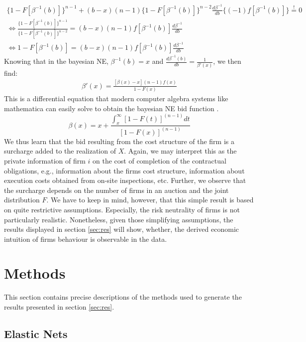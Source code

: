 \documentclass[a4paper,12pt, headsepline]{scrartcl}
\numberwithin{equation}{section}
\begin{document}
\begin{gather*}
\{1-F[\beta^{-1}(b)]\}^{n-1} + (b - x)(n - 		1)\{1-F[\beta^{-1}(b)]\}^{n-2}\frac{d\beta^{-1}}{db}\{(-1)f[\beta^{-1}(b)]\} \overset{!}{=} 0\\
	\iff \frac{\{1-F[\beta^{-1}(b)]\}^{n-1}}{\{1-F[\beta^{-1}(b)]\}^{n-2}} = (b - x)(n - 1)f[\beta^{-1}(b)]\frac{d\beta^{-1}}{db}\\
	\iff 1-F[\beta^{-1}(b)] = (b - x)(n - 1)f[\beta^{-1}(b)]\frac{d\beta^{-1}}{db}
\end{gather*}
Knowing that in the bayesian NE, $\beta^{-1}(b) = x$ and $\frac{d\beta^{-1}(b)}{db} = \frac{1}{\beta'(x)}$, we then find:
\begin{gather*}
	\beta'(x) = \frac{[\beta(x) - x](n - 1)f(x)}{1-F(x)}
\end{gather*}
This is a differential equation that modern computer algebra systems like mathematica can easily solve to obtain the bayesian NE bid function \citep{mathematica}.
\[
\beta(x) = x + \frac{\int_x^\infty [1 - F(t)]^{(n-1)}dt}{[1-F(x)]^{(n-1)}}
\]
We thus learn that the bid resulting from the cost structure of the firm is a surcharge added to the realization of $X$. Again, we may interpret this as the private information of firm $i$ on the cost of completion of the contractual obligations, e.g., information about the firms cost structure, information about execution costs obtained from on-site inspections, etc. Further, we observe that the surcharge depends on the number of firms in an auction and the joint distribution $F$. We have to keep in mind, however, that this simple result is based on quite restrictive assumptions. Especially, the risk neutrality of firms is not particularly realistic. Nonetheless, given those simplifying assumptions, the results displayed in section \ref{sec:res} will show, whether, the derived economic intuition of firms behaviour is observable in the data.
\newpage
\section{Methods}\label{sec:meth}

This section contains precise descriptions of the methods used to generate the results presented in section \ref{sec:res}.

\subsection{Elastic Nets}\label{subsec:net}
\end{document}
